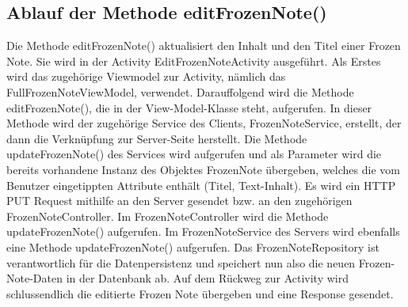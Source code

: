 \subsection{Ablauf der Methode editFrozenNote()}

Die Methode editFrozenNote() aktualisiert den Inhalt und den Titel einer Frozen Note. Sie wird in der Activity EditFrozenNoteActivity ausgeführt. Als Erstes wird das zugehörige Viewmodel zur Activity, nämlich das FullFrozenNoteViewModel, verwendet. Darauffolgend wird die Methode editFrozenNote(), die in der View-Model-Klasse steht, aufgerufen. In dieser Methode wird der zugehörige Service des Clients, FrozenNoteService, erstellt, der dann die Verknüpfung zur Server-Seite herstellt. Die Methode updateFrozenNote() des Services wird aufgerufen und als Parameter wird die bereits vorhandene Instanz des Objektes FrozenNote übergeben, welches die vom Benutzer eingetippten Attribute enthält (Titel, Text-Inhalt). Es wird ein HTTP PUT Request mithilfe an den Server gesendet bzw. an den zugehörigen FrozenNoteController. Im FrozenNoteController wird die Methode updateFrozenNote() aufgerufen. Im FrozenNoteService des Servers wird ebenfalls eine Methode updateFrozenNote() aufgerufen. Das FrozenNoteRepository ist verantwortlich für die Datenpersistenz und speichert nun also die neuen Frozen-Note-Daten in der Datenbank ab. Auf dem Rückweg zur Activity wird schlussendlich die editierte Frozen Note übergeben und eine Response gesendet.